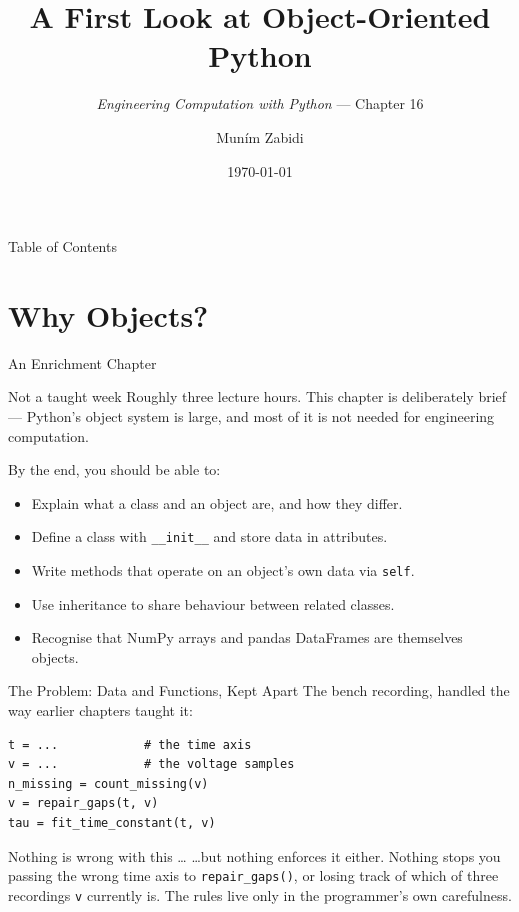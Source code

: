 \documentclass[9pt,aspectratio=169,xcolor=table]{beamer}
\title{A First Look at Object-Oriented Python}
\subtitle{\emph{Engineering Computation with Python} --- Chapter 16}
\author{Mun\'{i}m Zabidi}
\institute{\color{primary}Faculty of Electrical Engineering, Universiti Teknologi Malaysia}
\date{\today}
\begin{document}
\titlepage

\begin{frame}{Table of Contents}
    \tableofcontents
\end{frame}

\section{Why Objects?}

\begin{frame}{An Enrichment Chapter}
    \leavevmode
    \small
    \begin{alertblock}{Not a taught week}
        Roughly three lecture hours. This chapter is deliberately brief ---
        Python's object system is large, and most of it is not needed for
        engineering computation.
    \end{alertblock}

    \vspace{3mm}
    By the end, you should be able to:
    \begin{itemize}\itemsep1pt
        \item Explain what a class and an object are, and how they differ.
        \item Define a class with \texttt{\_\_init\_\_} and store data in
              attributes.
        \item Write methods that operate on an object's own data via
              \texttt{self}.
        \item Use inheritance to share behaviour between related classes.
        \item Recognise that NumPy arrays and pandas DataFrames are
              themselves objects.
    \end{itemize}
\end{frame}

\begin{frame}[fragile]{The Problem: Data and Functions, Kept Apart}
    \leavevmode
    The bench recording, handled the way earlier chapters taught it:

\begin{lstlisting}
t = ...            # the time axis
v = ...            # the voltage samples
n_missing = count_missing(v)
v = repair_gaps(t, v)
tau = fit_time_constant(t, v)
\end{lstlisting}

    \vspace{1mm}
    \begin{block}{Nothing is wrong with this \ldots}
        \ldots but nothing \alert{enforces} it either. Nothing stops you
        passing the wrong time axis to \texttt{repair\_gaps()}, or losing
        track of which of three recordings \texttt{v} currently is. The
        rules live only in the programmer's own carefulness.
    \end{block}
\end{frame}
\end{document}
